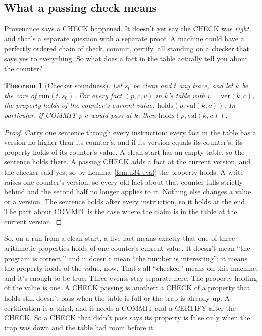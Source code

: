 \documentclass[11pt,twoside]{article}
\theoremstyle{thielethm}
\newtheorem{theorem}{Theorem}[section]
\theoremstyle{thieledef}
\theoremstyle{thieledef}
\theoremstyle{thieledef}
\theoremstyle{thielethm}
\theoremstyle{thieleobs}
\theoremstyle{thielethm}
\begin{document}
\subsection{What a passing check means}

Provenance says a CHECK happened. It doesn't yet say the CHECK was \emph{right}, and that's a
separate question with a separate proof. A machine could have a perfectly ordered chain of
check, commit, certify, all standing on a checker that says yes to everything. So what does
a fact in the table actually tell you about the counter?

\begin{theorem}[Checker soundness]\label{thm:u34-soundness}
Let $s_0$ be clean and $t$ any trace, and let $k$ be the core of $\mathrm{run}(t, s_0)$. For
every fact $(p, c, v)$ in $k$'s table with $v = \mathrm{ver}(k, c)$, the property holds of
the counter's current value: $\mathrm{holds}(p, \mathrm{val}(k, c))$. In particular, if
COMMIT $p$ $c$ would pass at $k$, then $\mathrm{holds}(p, \mathrm{val}(k, c))$.
\end{theorem}

\begin{proof}
Carry one sentence through every instruction: every fact in the table has a version no
higher than its counter's, and if its version equals its counter's, its property holds of
its counter's value. A clean start has an empty table, so the sentence holds there. A
passing CHECK adds a fact at the current version, and the checker said yes, so by
Lemma~\ref{lem:u34-eval} the property holds. A write raises one counter's version, so every
old fact about that counter falls strictly behind and the second half no longer applies to
it. Nothing else changes a value or a version. The sentence holds after every instruction,
so it holds at the end. The part about COMMIT is the case where the claim is in the table at
the current version.
\end{proof}

So, on a run from a clean start, a live fact means
exactly that one of three arithmetic properties holds of one counter's
current value. It doesn't mean ``the program is correct,'' and it doesn't mean ``the number is
interesting''; it means the property holds of the value, now. That's all ``checked'' means on this
machine, and it's enough to be true.
Three events stay separate here. The property holding of the value is one. A CHECK passing is
another: a CHECK of a property that holds still doesn't pass when the table is full or the trap
is already up. A certification is a third, and it needs a COMMIT and a CERTIFY after the CHECK.
So a CHECK that didn't pass says its property is false only when the trap was down and the table had room before it.
\end{document}
